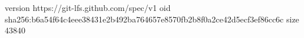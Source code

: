 version https://git-lfs.github.com/spec/v1
oid sha256:b6a54f64c4eee38431e2b492ba764657e8570fb2b8f0a2ce42d5ecf3ef86cc6c
size 43840
